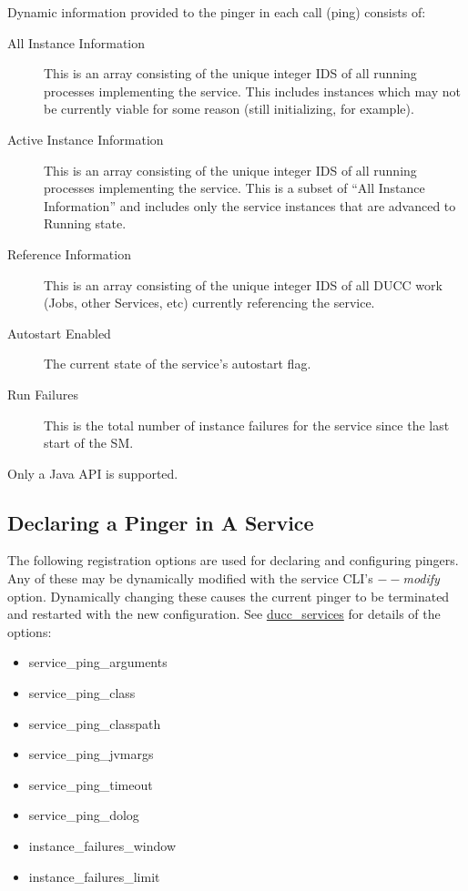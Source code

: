       Dynamic information provided to the pinger in each call (ping) consists of:
      \begin{description}
        \item[All Instance Information] This is an array consisting of the unique integer
          IDS of all running processes implementing the service.  This includes instances
          which may not be currently viable for some reason (still initializing, for example).

        \item[Active Instance Information] This is an array consisting of the unique integer
          IDS of all running processes implementing the service.  This is a subset of 
          ``All Instance Information'' and includes only the service instances that are advanced
          to Running state.

        \item[Reference Information] This is an array consisting of the unique integer
          IDS of all DUCC work (Jobs, other Services, etc) currently referencing the
          service.  
          
        \item[Autostart Enabled] The current state of the service's autostart flag.
          
        \item[Run Failures] This is the total number of instance failures for the 
          service since the last start of the SM.
      \end{description}

      Only a Java API is supported.

      \subsection{Declaring a Pinger in A Service}

      The following registration options are used for declaring and configuring pingers.  Any of these
      may be dynamically modified with the service CLI's {\em$--$modify} option.  Dynamically changing
      these causes the current pinger to be terminated and restarted with the new configuration.  See
      \hyperref[sec:cli.ducc-services]{ducc\_services} for details of the options:
      \begin{itemize}
        \item service\_ping\_arguments
        \item service\_ping\_class
        \item service\_ping\_classpath
        \item service\_ping\_jvmargs
        \item service\_ping\_timeout
        \item service\_ping\_dolog
        \item instance\_failures\_window
        \item instance\_failures\_limit
      \end{itemize}

